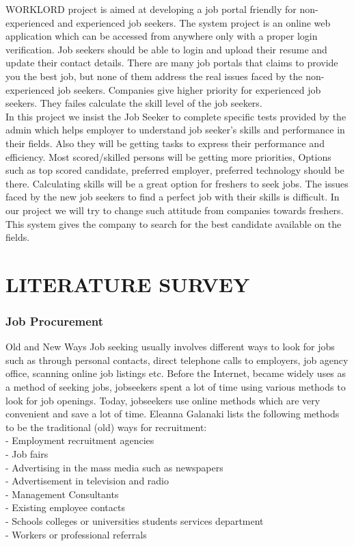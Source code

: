 \documentclass[a4paper,12pt]{report}
\begin{document}
WORKLORD project is aimed at developing a job portal friendly for non-experienced and experienced job seekers. The system project is an online web application which can be accessed from anywhere only with a proper login verification. Job seekers should be able to login and upload their resume and update their contact details. There are many job portals that claims to provide you the best job, but none of them address the real issues faced by the non-experienced job seekers. Companies give higher priority for experienced job seekers. They failes calculate the skill level of the job seekers. \\

 In this project we insist the Job Seeker to complete specific tests provided by the admin which helps employer to understand job seeker's skills and performance in their fields. Also they will be getting tasks to express their performance and efficiency. Most scored/skilled persons will be getting more priorities, Options such as top scored candidate, preferred employer, preferred technology should be there. Calculating skills will be a great option for freshers to seek jobs. The issues faced by the new job seekers to find a perfect job with their skills is difficult. In our project we will try to change such attitude from companies towards freshers. This system gives the company to search for the best candidate available on the fields.\\

\pagebreak

\chapter{LITERATURE SURVEY}
\subsection{Job Procurement}

\hspace*{12pt}Old and New Ways Job seeking usually involves different ways to look for jobs such as through personal contacts, direct telephone calls to employers, job agency office, scanning online job listings etc. Before the Internet, became widely uses as a method of seeking jobs, jobseekers spent a lot of time using various methods to look for job openings. Today, jobseekers use online methods which are very convenient and save a lot of time. Eleanna Galanaki lists the following methods to be the traditional (old) ways for recruitment:
\subitem
\\ - Employment recruitment agencies
\\ - Job fairs
\\ - Advertising in the mass media such as newspapers
\\ - Advertisement in television and radio
\\ - Management Consultants
\\ - Existing employee contacts
\\ - Schools colleges or universities students services department
\\ - Workers or professional referrals \\
\end{document}
